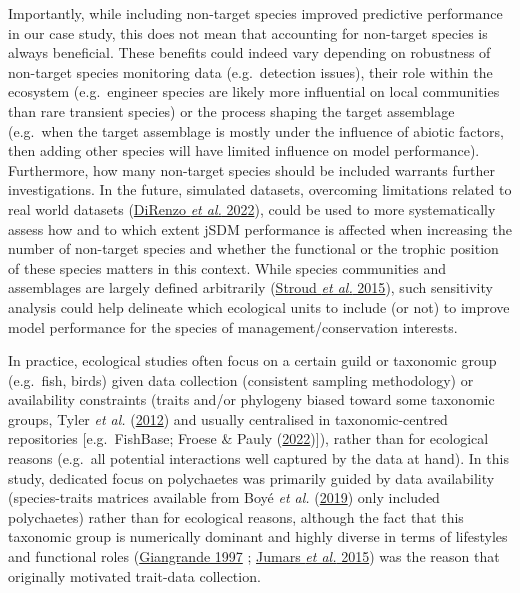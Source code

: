 \documentclass[9pt,biorxiv,doublespacing,lineno]{lapreprint}
\begin{document}
Importantly, while including non-target species improved predictive
performance in our case study, this does not mean that accounting for
non-target species is always beneficial. These benefits could indeed
vary depending on robustness of non-target species monitoring data
(e.g.~detection issues), their role within the ecosystem (e.g.~engineer
species are likely more influential on local communities than rare
transient species) or the process shaping the target assemblage
(e.g.~when the target assemblage is mostly under the influence of
abiotic factors, then adding other species will have limited influence
on model performance). Furthermore, how many non-target species should
be included warrants further investigations. In the future, simulated
datasets, overcoming limitations related to real world datasets
(\protect\hyperlink{ref-DiRenzo_2022}{DiRenzo \emph{et al.} 2022}),
could be used to more systematically assess how and to which extent jSDM
performance is affected when increasing the number of non-target species
and whether the functional or the trophic position of these species
matters in this context. While species communities and assemblages are
largely defined arbitrarily (\protect\hyperlink{ref-Stroud_2015}{Stroud
\emph{et al.} 2015}), such sensitivity analysis could help delineate
which ecological units to include (or not) to improve model performance
for the species of management/conservation interests.

In practice, ecological studies often focus on a certain guild or
taxonomic group (e.g.~fish, birds) given data collection (consistent
sampling methodology) or availability constraints (traits and/or
phylogeny biased toward some taxonomic groups, Tyler \emph{et al.}
(\protect\hyperlink{ref-Tyler_2012}{2012}) and usually centralised in
taxonomic-centred repositories {[}e.g.~FishBase; Froese \& Pauly
(\protect\hyperlink{ref-Froese_2022}{2022}){]}), rather than for
ecological reasons (e.g.~all potential interactions well captured by the
data at hand). In this study, dedicated focus on polychaetes was
primarily guided by data availability (species-traits matrices available
from Boyé \emph{et al.} (\protect\hyperlink{ref-Boye_2019a}{2019}) only
included polychaetes) rather than for ecological reasons, although the
fact that this taxonomic group is numerically dominant and highly
diverse in terms of lifestyles and functional roles
(\protect\hyperlink{ref-Giangrande_1997}{Giangrande 1997} ;
\protect\hyperlink{ref-Jumars_2015}{Jumars \emph{et al.} 2015}) was the
reason that originally motivated trait-data collection.
\end{document}
